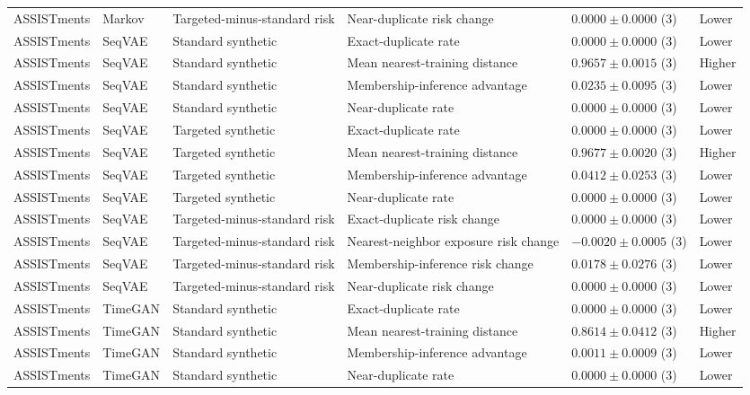 \begin{longtable}{@{}p{2.25cm}p{2.05cm}p{4.7cm}p{5.0cm}p{2.6cm}p{1.25cm}@{}}
ASSISTments & Markov & Targeted-minus-standard risk & Near-duplicate risk change & $0.0000 \mathbin{\pm} 0.0000$ (3) & Lower \\
ASSISTments & SeqVAE & Standard synthetic & Exact-duplicate rate & $0.0000 \mathbin{\pm} 0.0000$ (3) & Lower \\
ASSISTments & SeqVAE & Standard synthetic & Mean nearest-training distance & $0.9657 \mathbin{\pm} 0.0015$ (3) & Higher \\
ASSISTments & SeqVAE & Standard synthetic & Membership-inference advantage & $0.0235 \mathbin{\pm} 0.0095$ (3) & Lower \\
ASSISTments & SeqVAE & Standard synthetic & Near-duplicate rate & $0.0000 \mathbin{\pm} 0.0000$ (3) & Lower \\
ASSISTments & SeqVAE & Targeted synthetic & Exact-duplicate rate & $0.0000 \mathbin{\pm} 0.0000$ (3) & Lower \\
ASSISTments & SeqVAE & Targeted synthetic & Mean nearest-training distance & $0.9677 \mathbin{\pm} 0.0020$ (3) & Higher \\
ASSISTments & SeqVAE & Targeted synthetic & Membership-inference advantage & $0.0412 \mathbin{\pm} 0.0253$ (3) & Lower \\
ASSISTments & SeqVAE & Targeted synthetic & Near-duplicate rate & $0.0000 \mathbin{\pm} 0.0000$ (3) & Lower \\
ASSISTments & SeqVAE & Targeted-minus-standard risk & Exact-duplicate risk change & $0.0000 \mathbin{\pm} 0.0000$ (3) & Lower \\
ASSISTments & SeqVAE & Targeted-minus-standard risk & Nearest-neighbor exposure risk change & $-0.0020 \mathbin{\pm} 0.0005$ (3) & Lower \\
ASSISTments & SeqVAE & Targeted-minus-standard risk & Membership-inference risk change & $0.0178 \mathbin{\pm} 0.0276$ (3) & Lower \\
ASSISTments & SeqVAE & Targeted-minus-standard risk & Near-duplicate risk change & $0.0000 \mathbin{\pm} 0.0000$ (3) & Lower \\
ASSISTments & TimeGAN & Standard synthetic & Exact-duplicate rate & $0.0000 \mathbin{\pm} 0.0000$ (3) & Lower \\
ASSISTments & TimeGAN & Standard synthetic & Mean nearest-training distance & $0.8614 \mathbin{\pm} 0.0412$ (3) & Higher \\
ASSISTments & TimeGAN & Standard synthetic & Membership-inference advantage & $0.0011 \mathbin{\pm} 0.0009$ (3) & Lower \\
ASSISTments & TimeGAN & Standard synthetic & Near-duplicate rate & $0.0000 \mathbin{\pm} 0.0000$ (3) & Lower \\

\end{longtable}
